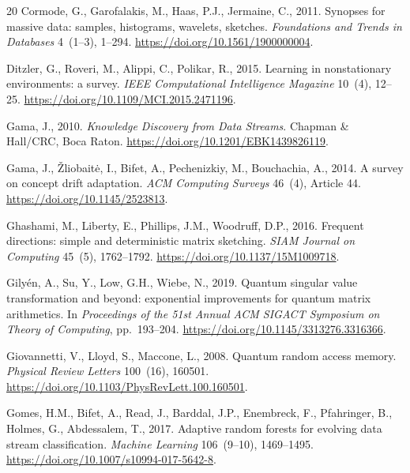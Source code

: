\documentclass[preprint,12pt,authoryear]{elsarticle}
\begin{document}
\begin{thebibliography}{20}
Cormode, G., Garofalakis, M., Haas, P.J., Jermaine, C., 2011.
\newblock Synopses for massive data: samples, histograms, wavelets, sketches.
\newblock \emph{Foundations and Trends in Databases} 4~(1--3), 1--294.
\newblock \url{https://doi.org/10.1561/1900000004}.

Ditzler, G., Roveri, M., Alippi, C., Polikar, R., 2015.
\newblock Learning in nonstationary environments: a survey.
\newblock \emph{IEEE Computational Intelligence Magazine} 10~(4), 12--25.
\newblock \url{https://doi.org/10.1109/MCI.2015.2471196}.

Gama, J., 2010.
\newblock \emph{Knowledge Discovery from Data Streams}.
\newblock Chapman \& Hall/CRC, Boca Raton.
\newblock \url{https://doi.org/10.1201/EBK1439826119}.

Gama, J., \v{Z}liobait\.e, I., Bifet, A., Pechenizkiy, M., Bouchachia, A., 2014.
\newblock A survey on concept drift adaptation.
\newblock \emph{ACM Computing Surveys} 46~(4), Article 44.
\newblock \url{https://doi.org/10.1145/2523813}.

Ghashami, M., Liberty, E., Phillips, J.M., Woodruff, D.P., 2016.
\newblock Frequent directions: simple and deterministic matrix sketching.
\newblock \emph{SIAM Journal on Computing} 45~(5), 1762--1792.
\newblock \url{https://doi.org/10.1137/15M1009718}.

Gily\'en, A., Su, Y., Low, G.H., Wiebe, N., 2019.
\newblock Quantum singular value transformation and beyond: exponential improvements for quantum matrix arithmetics.
\newblock In \emph{Proceedings of the 51st Annual ACM SIGACT Symposium on Theory of Computing}, pp.~193--204.
\newblock \url{https://doi.org/10.1145/3313276.3316366}.

Giovannetti, V., Lloyd, S., Maccone, L., 2008.
\newblock Quantum random access memory.
\newblock \emph{Physical Review Letters} 100~(16), 160501.
\newblock \url{https://doi.org/10.1103/PhysRevLett.100.160501}.

Gomes, H.M., Bifet, A., Read, J., Barddal, J.P., Enembreck, F., Pfahringer, B., Holmes, G., Abdessalem, T., 2017.
\newblock Adaptive random forests for evolving data stream classification.
\newblock \emph{Machine Learning} 106~(9--10), 1469--1495.
\newblock \url{https://doi.org/10.1007/s10994-017-5642-8}.


\end{thebibliography}
\end{document}

